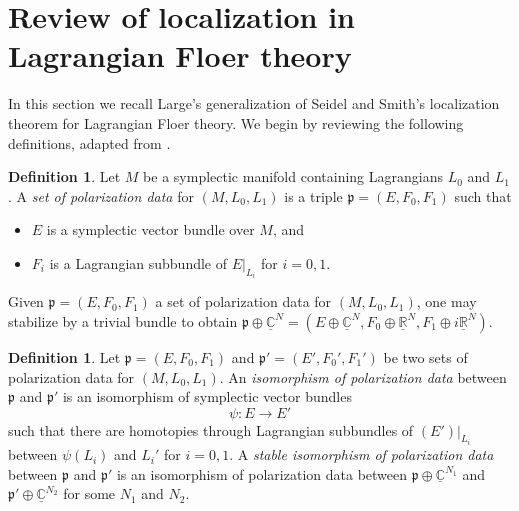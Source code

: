 \documentclass[11pt,reqno]{amsart}
\theoremstyle{definition}
\newtheorem{define}[thm]{Definition}
\theoremstyle{remark}
\newcommand{\bC}{\mathbb{C}}
\newcommand{\bR}{\mathbb{R}}
\numberwithin{equation}{section}
\newcommand\co{\colon}
\begin{document}
\section{Review of localization in Lagrangian Floer theory} \label{sec:Large}

In this section we recall Large's generalization of Seidel and Smith's localization theorem for Lagrangian Floer theory. We begin by reviewing the following definitions, adapted from \cite[Section 3.2]{Large}.

\begin{define} Let $M$ be a symplectic manifold containing Lagrangians $L_0$ and $L_1$. A \emph{set of polarization data} for $(M, L_0, L_1)$ is a triple $\mathfrak p = (E, F_0, F_1)$ such that
%
\begin{itemize}
\item $E$ is a symplectic vector bundle over $M$, and
\item $F_i$ is a Lagrangian subbundle of $E|_{L_i}$ for $i=0,1$.
\end{itemize}
\end{define}

Given $\mathfrak p = (E, F_0, F_1)$ a set of polarization data for $(M, L_0, L_1)$, one may stabilize by a trivial bundle to obtain $\mathfrak p \oplus \underline{\bC}^N = (E \oplus  \underline{\bC}^N, F_0 \oplus \underline{\bR}^N, F_1 \oplus i \underline{\bR}^N)$. 


\begin{define} Let $\mathfrak p = (E, F_0, F_1)$ and $\mathfrak p' = (E', F_0', F_1')$ be two sets of polarization data for $(M, L_0, L_1)$. An \emph{isomorphism of polarization data} between $\mathfrak p$ and $\mathfrak p'$ is an isomorphism of symplectic vector bundles 
%
\[\psi \co E \rightarrow E'\]
%
such that there are homotopies through Lagrangian subbundles of $(E')|_{L_i}$ between $\psi(L_i)$ and $L_i'$ for $i=0,1$. A \emph{stable isomorphism of polarization data} between $\mathfrak p$ and $\mathfrak p'$ is an isomorphism of polarization data between $\mathfrak p \oplus \underline{\bC}^{N_1}$ and $\mathfrak p' \oplus \underline{\bC}^{N_2}$ for some $N_1$ and $N_2$.\end{define}
\end{document}
